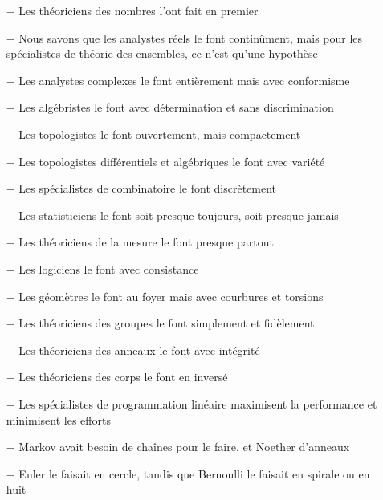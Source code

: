 \begin{itemize}	 
	\item[$-$] Les théoriciens des nombres l'ont fait en premier

	\item[$-$] Nous savons que les analystes réels le font continûment, mais pour les spécialistes de théorie des ensembles, ce n'est qu'une hypothèse

	\item[$-$] Les analystes complexes le font entièrement mais avec conformisme

	\item[$-$] Les algébristes le font avec détermination et sans discrimination

	\item[$-$] Les topologistes le font ouvertement, mais compactement

	\item[$-$] Les topologistes différentiels et algébriques le font avec variété

	\item[$-$] Les spécialistes de combinatoire le font discrètement

	\item[$-$] Les statisticiens le font soit presque toujours, soit presque jamais

	\item[$-$] Les théoriciens de la mesure le font presque partout

	\item[$-$] Les logiciens le font avec consistance

	\item[$-$] Les géomètres le font au foyer mais avec courbures et torsions

	\item[$-$] Les théoriciens des groupes le font simplement et fidèlement

	\item[$-$] Les théoriciens des anneaux le font avec intégrité

	\item[$-$] Les théoriciens des corps le font en inversé

	\item[$-$] Les spécialistes de programmation linéaire maximisent la performance et minimisent les efforts

	\item[$-$] Markov avait besoin de chaînes pour le faire, et Noether d'anneaux

	\item[$-$] Euler le faisait en cercle, tandis que Bernoulli le faisait en spirale ou en huit


\end{itemize}
